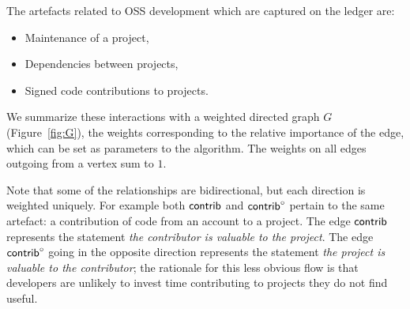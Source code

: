 The artefacts related to OSS development which are captured on the \oscoin{}
ledger are:
\begin{itemize}
  \item Maintenance of a project,
  \item Dependencies between projects,
  \item Signed code contributions to projects.
\end{itemize}
We summarize these interactions with a weighted directed graph $G$
(Figure~\ref{fig:G}), the weights corresponding to the relative importance of
the edge, which can be set as parameters to the algorithm.  The weights on all
edges outgoing from a vertex sum to $1$.

\begin{center}
\end{center}
\medskip


\noindent Note that some of the relationships are bidirectional, but each direction is
weighted uniquely. For example both $\mathsf{contrib}$ and $\mathsf{contrib}^\circ$ pertain to
the same artefact: a contribution of code from an account to a
project. The edge $\mathsf{contrib}$ represents the statement \emph{the contributor
is valuable to the project}. The edge $\mathsf{contrib}^\circ$ going in the
opposite direction represents the statement \emph{the project is
valuable to the contributor}; the rationale for this less obvious flow is
that developers are unlikely to invest time contributing to projects they
do not find useful.


